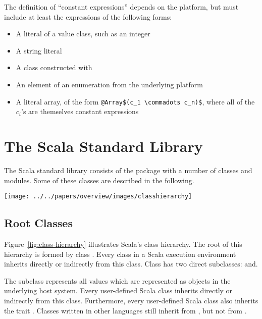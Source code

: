 {The definition of ``constant expressions'' depends on the platform, but
must include at least the expressions of the following forms:
\begin{itemize}
\item A literal of a value class, such as an integer
\item A string literal
\item A class constructed with 
\item An element of an enumeration from the underlying platform
\item A literal array, of the form
      \lstinline^@Array$(c_1 \commadots c_n)$^,
      where all of the $c_i$'s are themselves constant expressions
\end{itemize}


\chapter{The Scala Standard Library}

The Scala standard library consists of the package  with a
number of classes and modules. Some of these classes are described in
the following.

\begin{figure*}
\label{fig:class-hierarchy}
\centering
\texttt{[image: ../../papers/overview/images/classhierarchy]}
\vspace*{-1.5mm}
\caption{Class hierarchy of Scala.}
\end{figure*}

\section{Root Classes}
\label{sec:cls-root}
\label{sec:cls-any}
\label{sec:cls-object}

Figure~\ref{fig:class-hierarchy} illustrates Scala's class
hierarchy.
The root of this hierarchy is formed by class .
Every class in a Scala execution environment inherits directly or
indirectly from this class.  Class  has two direct
subclasses:  and.

The subclass  represents all values which are represented
as objects in the underlying host system. Every user-defined Scala
class inherits directly or indirectly from this class. Furthermore,
every user-defined Scala class also inherits the trait
.  Classes written in other languages still
inherit from , but not from
.

}
